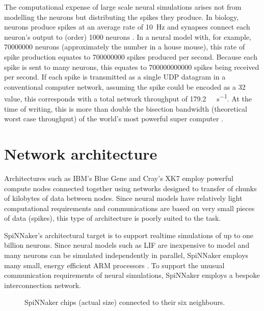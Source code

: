 		The computational expense of large scale neural simulations arises not from
		modelling the neurons but distributing the spikes they produce. In biology,
		neurons produce spikes at an average rate of \SI{10}{\hertz} and synapses
		connect each neuron's output to (order) \num{1000} neurons
		\cite{navaridas09}. In a neural model with, for example, \num{70000000}
		neurons (approximately the number in a house mouse), this rate of spike
		production equates to \num{700000000} spikes produced per second.  Because
		each spike is sent to many neurons, this equates to \num{700000000000}
		spikes being received per second. If each spike is transmitted as a single
		UDP datagram in a conventional computer network, assuming the spike could
		be encoded as a \SI{32}{\bit} value, this corresponds with a total network
		throughput of \SI{179.2}{\tera\bit\per\second}. At the time of writing,
		this is more than double the bisection bandwidth (theoretical worst case
		throughput) of the world's most powerful super computer \cite{dongarra16}.
	
	\section{Network architecture}
		
		Architectures such as IBM's Blue Gene \cite{chiu11} and Cray's XK7
		\cite{ornl16} employ powerful compute nodes connected together using
		networks designed to transfer of chunks of kilobytes of data between nodes.
		Since neural models have relatively light computational requirements and
		communications are based on very small pieces of data (spikes), this type
		of architecture is poorly suited to the task.
		
		SpiNNaker's architectural target is to support realtime simulations of up
		to one billion neurons. Since neural models such as LIF are inexpensive to
		model and many neurons can be simulated independently in parallel,
		SpiNNaker employs many small, energy efficient ARM processors
		\cite{furber07}. To support the unusual communication requirements of
		neural simulations, SpiNNaker employs a bespoke interconnection network.
		
		
		\begin{figure}
			\center
			
			\caption{SpiNNaker chips (actual size) connected to their six neighbours.}
			\label{fig:spinnakerChip}
		\end{figure}
		

